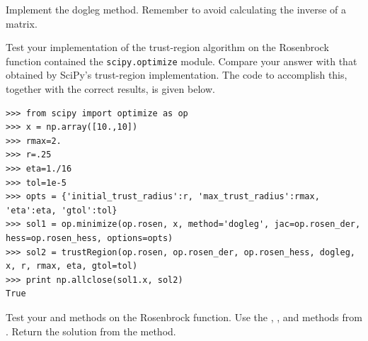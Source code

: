 \begin{problem}
Implement the dogleg method.
Remember to avoid calculating the inverse of a matrix.


\label{prob:dogleg}
\end{problem}

Test your implementation of the trust-region algorithm on the Rosenbrock function contained the {\tt scipy.optimize} module.
Compare your answer with that obtained by SciPy's trust-region implementation. The code to accomplish this, together with the
correct results, is given below.
\begin{lstlisting}
>>> from scipy import optimize as op
>>> x = np.array([10.,10])
>>> rmax=2.
>>> r=.25
>>> eta=1./16
>>> tol=1e-5
>>> opts = {'initial_trust_radius':r, 'max_trust_radius':rmax, 'eta':eta, 'gtol':tol}
>>> sol1 = op.minimize(op.rosen, x, method='dogleg', jac=op.rosen_der, hess=op.rosen_hess, options=opts)
>>> sol2 = trustRegion(op.rosen, op.rosen_der, op.rosen_hess, dogleg, x, r, rmax, eta, gtol=tol)
>>> print np.allclose(sol1.x, sol2)
True
\end{lstlisting}
\begin{problem}
Test your  and  methods on the Rosenbrock function.  Use the , , and  methods from .  Return the solution  from the  method.
\end{problem}

